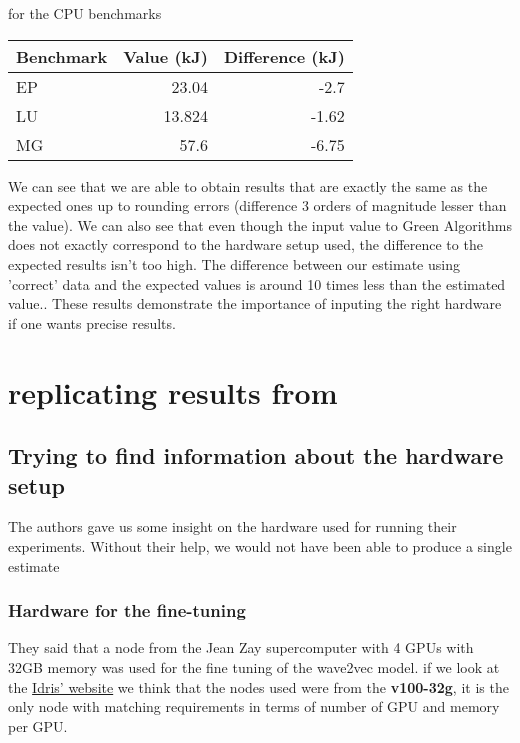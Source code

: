\documentclass[11pt]{article}
\begin{document}
for the CPU benchmarks
\begin{center}
\begin{tabular}{lrr}
Benchmark & Value (kJ) & Difference (kJ)\\
\hline
EP & 23.04 & -2.7\\
LU & 13.824 & -1.62\\
MG & 57.6 & -6.75\\
\end{tabular}
\end{center}

We can see that we are able to obtain results that are exactly the
same as the expected ones up to rounding errors (difference 3 orders of magnitude
lesser than the value). We can also see that even though the input
value to Green Algorithms does not exactly correspond to the hardware
setup used, the difference to the expected
results isn't too high. The difference between our estimate using
'correct' data and the expected values is around 10 times less than the estimated value..
These results demonstrate the importance of inputing the right
hardware if one wants precise results.

\section{replicating results from \cite{Dinarelli2022toward}}
\label{sec:orgc3101e4}

\subsection{Trying to find information about the hardware setup}
\label{sec:org06014fa}

The authors gave us some insight on the hardware used for running
their experiments. Without their help, we would not have been able to
produce a single estimate 

\subsubsection{Hardware for the fine-tuning}
\label{sec:org049424d}
They said that a node from the Jean Zay supercomputer with 4 GPUs with
32GB memory was used for the fine tuning of the wave2vec model. if we look at the \href{http://www.idris.fr/jean-zay/cpu/jean-zay-cpu-hw.html\#gpu\_p13}{Idris' website} we
think that the nodes used were from the \textbf{v100-32g}, it is the only node
with matching requirements in terms of number of GPU and memory per
GPU.
\end{document}
